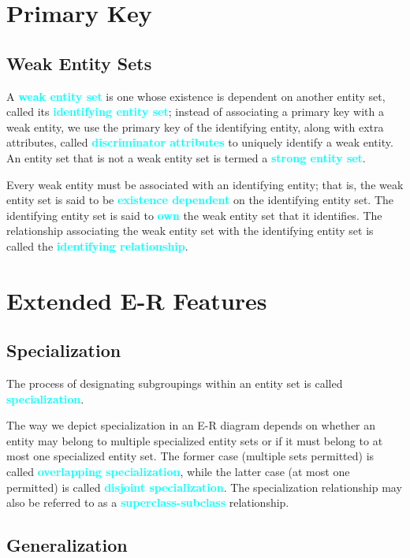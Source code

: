 \documentclass[a4paper,12pt,twoside,openany]{book}
\newcommand{\textcy}[1]{\textbf{\textcolor{cyan}{#1}}}
\begin{document}
\section{Primary Key}
\subsection{Weak Entity Sets}

A \textcy{weak entity set} is one whose existence is dependent on another entity set, called its \textcy{identifying entity set}; instead of associating a primary key with a weak entity, we use the primary key of the identifying entity, along with extra attributes, called \textcy{discriminator attributes} to uniquely identify a weak entity. An entity set that is not a weak entity set is termed a \textcy{strong entity set}.

Every weak entity must be associated with an identifying entity; that is, the weak entity set is said to be \textcy{existence dependent} on the identifying entity set. The identifying entity set is said to \textcy{own} the weak entity set that it identifies. The relationship associating the weak entity set with the identifying entity set is called the \textcy{identifying relationship}.

\section{Extended E-R Features}
\subsection{Specialization}

The process of designating subgroupings within an entity set is called \textcy{specialization}.

The way we depict specialization in an E-R diagram depends on whether an entity may belong to multiple specialized entity sets or if it must belong to at most one specialized entity set. The former case (multiple sets permitted) is called \textcy{overlapping specialization}, while the latter case (at most one permitted) is called \textcy{disjoint specialization}. The specialization relationship may also be referred to as a \textcy{superclass-subclass} relationship.

\subsection{Generalization}
\end{document}
